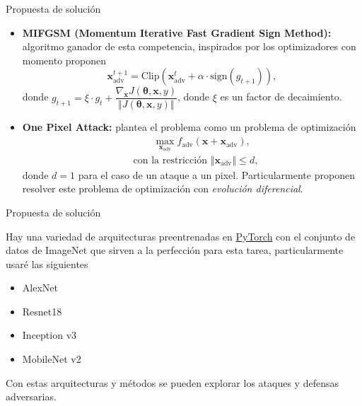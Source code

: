 \documentclass[10pt]{beamer}
\begin{document}
\begin{frame}{Propuesta de solución}
\justify	
\small

\begin{itemize}
\item \textbf{MIFGSM (Momentum Iterative Fast Gradient Sign Method):} algoritmo ganador de esta competencia, inspirados por los optimizadores con momento proponen
%
\[ \bm{x}_{\text{adv}}^{t+1} = \text{Clip}\left( \bm{x}_{\text{adv}}^{t} + \alpha \cdot  \text{sign}(g_{t+1}) \right), \]
%
donde $g_{t+1} = \xi \cdot g_{t} + \dfrac{ \nabla_{\bm{x}} J(\bm{\theta}, \bm{x}, y)}{\left\Vert J(\bm{\theta}, \bm{x}, y) \right\Vert} $, donde $\xi$ es un factor de decaimiento.

\item \textbf{One Pixel Attack:} plantea el problema como un problema de optimización
%
\begin{align*}
& \hspace{2em} \max_{\bm{x}_{\text{adv}}} f_{\text{adv}} (\bm{x} + \bm{x}_{\text{adv}}), \\
& \text{con la restricción } \left\Vert \bm{x}_{\text{adv}} \right\Vert \leq d,
\end{align*}
%
donde $d = 1$ para el caso de un ataque a un pixel. Particularmente proponen resolver este problema de optimización con \emph{evolución diferencial}.

\end{itemize}

\end{frame}

\begin{frame}{Propuesta de solución}
\justify	
\small

Hay una variedad de arquitecturas preentrenadas en \href{https://pytorch.org/vision/stable/models.html}{PyTorch} con el conjunto de datos de ImageNet que sirven a la perfección para esta tarea, particularmente usaré las siguientes

\begin{itemize}
\item AlexNet
\item Resnet18
\item Inception v3
\item MobileNet v2
\end{itemize}

Con estas arquitecturas y métodos se pueden explorar los ataques y defensas adversarias.

\end{frame}
\end{document}
